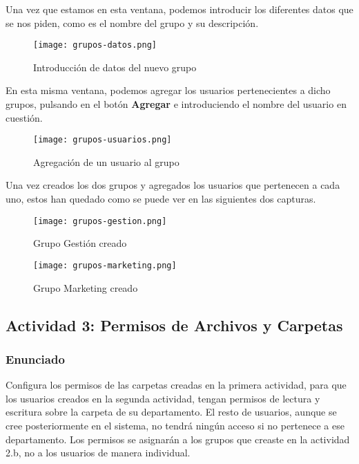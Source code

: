 \begin{enumerate}
    Una vez que estamos en esta ventana, podemos introducir los diferentes datos que se nos piden, como es el nombre del grupo y su descripción.

    \begin{figure}[H]
        \centering
        \texttt{[image: grupos-datos.png]}
        \caption{Introducción de datos del nuevo grupo}
    \end{figure}

    En esta misma ventana, podemos agregar los usuarios pertenecientes a dicho grupos, pulsando en el botón \textbf{Agregar} e introduciendo el nombre del usuario en cuestión.

    \begin{figure}[H]
        \centering
        \texttt{[image: grupos-usuarios.png]}
        \caption{Agregación de un usuario al grupo}
    \end{figure}

    Una vez creados los dos grupos y agregados los usuarios que pertenecen a cada uno, estos han quedado como se puede ver en las siguientes dos capturas.

    \begin{figure}[H]
        \centering
        \texttt{[image: grupos-gestion.png]}
        \caption{Grupo Gestión creado}
    \end{figure}

    \begin{figure}[H]
        \centering
        \texttt{[image: grupos-marketing.png]}
        \caption{Grupo Marketing creado}
    \end{figure}
\end{enumerate}

\subsection{Actividad 3: Permisos de Archivos y Carpetas}

\subsubsection{Enunciado}
Configura los permisos de las carpetas creadas en la primera actividad, para que los usuarios creados en la segunda actividad, tengan permisos de lectura y escritura sobre la carpeta de su departamento. El resto de usuarios, aunque se cree posteriormente en el sistema, no tendrá ningún acceso si no pertenece a ese departamento. Los permisos se asignarán a los grupos que creaste en la actividad 2.b, no a los usuarios de manera individual.

